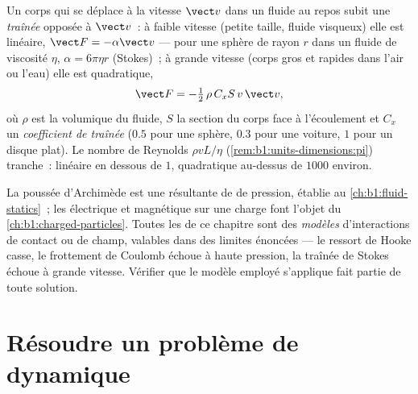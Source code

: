 \begin{proposition}\label{prop:b1:newton-dynamics:drag}
Un corps qui se déplace à la vitesse $\vect v$ dans un fluide au repos
subit une \emph{traînée} opposée à $\vect v$~: à faible vitesse (petite
taille, fluide visqueux) elle est linéaire, $\vect F = -\alpha\vect v$
--- pour une sphère de rayon $r$ dans un fluide de viscosité $\eta$,
$\alpha = 6\pi\eta r$ (Stokes)~; à grande vitesse (corps gros et
rapides dans l'air ou l'eau) elle est quadratique,
\[
\vect F = -\tfrac12\,\rho\,C_xS\,v\,\vect v ,
\]
où $\rho$ est la  volumique du fluide, $S$ la section du corps face
à l'écoulement et $C_x$ un \emph{coefficient de traînée} 
($0.5$ pour une sphère, $0.3$ pour une voiture, $1$ pour un disque
plat). Le nombre de Reynolds $\rho vL/\eta$
(\cref{rem:b1:units-dimensions:pi}) tranche~: linéaire en dessous de
$1$, quadratique au-dessus de $1000$ environ.
\end{proposition}
\admitted

\begin{remark}\label{rem:b1:newton-dynamics:others}
La poussée d'Archimède est une résultante de  de pression,
établie au \cref{ch:b1:fluid-statics}~; les  électrique et
magnétique sur une charge font l'objet du
\cref{ch:b1:charged-particles}. Toutes les  de ce chapitre sont
des \emph{modèles} d'interactions de contact ou de champ, valables dans
des limites énoncées --- le ressort de Hooke casse, le frottement de
Coulomb échoue à haute pression, la traînée de Stokes échoue à grande
vitesse. Vérifier que le modèle employé s'applique fait partie de toute
solution.
\end{remark}

\section{Résoudre un problème de dynamique}

